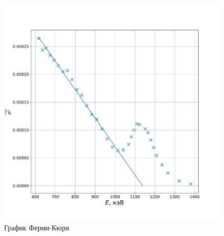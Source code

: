 \documentclass[a4paper, 12pt]{article}
\begin{document}
\begin{figure}[!h]
    \includegraphics[scale = 0.4]{F-K}
    \centering
    \caption{График Ферми-Кюри}
    \label{img:F_K}
\end{figure}
\end{document}
